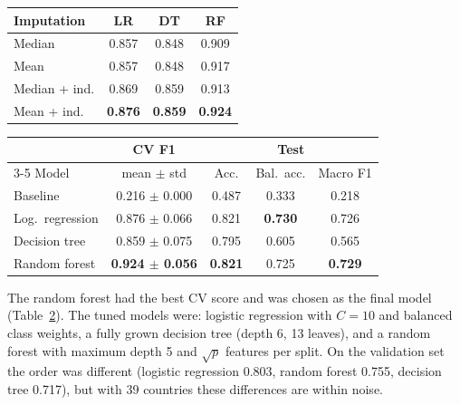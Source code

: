 \documentclass[10pt]{article}
\begin{document}
\begin{table}[h]
\centering\small\setlength{\tabcolsep}{4pt}
\begin{minipage}[t]{0.37\textwidth}\vspace{0pt}\centering
\begin{tabular}{lccc}
\toprule
Imputation & LR & DT & RF \\
\midrule
Median & 0.857 & 0.848 & 0.909 \\
Mean & 0.857 & 0.848 & 0.917 \\
Median + ind. & 0.869 & 0.859 & 0.913 \\
Mean + ind. & \textbf{0.876} & \textbf{0.859} & \textbf{0.924} \\
\bottomrule
\end{tabular}
\label{tab:imp}
\end{minipage}\hfill
\begin{minipage}[t]{0.61\textwidth}\vspace{0pt}\centering
\begin{tabular}{lcccc}
\toprule
 & CV F1 & \multicolumn{3}{c}{Test} \\
\cmidrule(lr){3-5}
Model & mean $\pm$ std & Acc. & Bal.\ acc. & Macro F1 \\
\midrule
Baseline & 0.216 $\pm$ 0.000 & 0.487 & 0.333 & 0.218 \\
Log.\ regression & 0.876 $\pm$ 0.066 & 0.821 & \textbf{0.730} & 0.726 \\
Decision tree & 0.859 $\pm$ 0.075 & 0.795 & 0.605 & 0.565 \\
Random forest & \textbf{0.924 $\pm$ 0.056} & \textbf{0.821} & 0.725 & \textbf{0.729} \\
\bottomrule
\end{tabular}
\label{tab:models}
\end{minipage}
\end{table}

The random forest had the best CV score and was chosen as the final model (Table~\ref{tab:models}). The tuned
models were: logistic regression with $C=10$ and balanced class weights, a fully grown decision tree (depth 6, 13
leaves), and a random forest with maximum depth 5 and $\sqrt{p}$ features per split. On the validation set the
order was different (logistic regression 0.803, random forest 0.755, decision tree 0.717), but with 39 countries
these differences are within noise.
\end{document}
